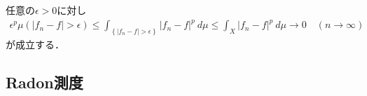 		\begin{prf}
			任意の$\epsilon > 0$に対し
			\begin{align}
				\epsilon^p \mu\left(|f_n - f| > \epsilon\right)
				\leq \int_{\left\{|f_n - f| > \epsilon\right\}} |f_n-f|^p\ d\mu
				\leq \int_X |f_n - f|^p\ d\mu \longrightarrow 0
				\quad (n \longrightarrow \infty)
			\end{align}
			が成立する．
			\QED
		\end{prf}
		
		\begin{screen}
			\begin{thm}[Egorov]
			\end{thm}
		\end{screen}
		
	\subsection{Radon測度}
		\begin{screen}
			\begin{thm}
			\end{thm}
		\end{screen}
		
		\begin{screen}
			\begin{thm}[正値Borel測度の正則性定理]
				
			\end{thm}
		\end{screen}
	